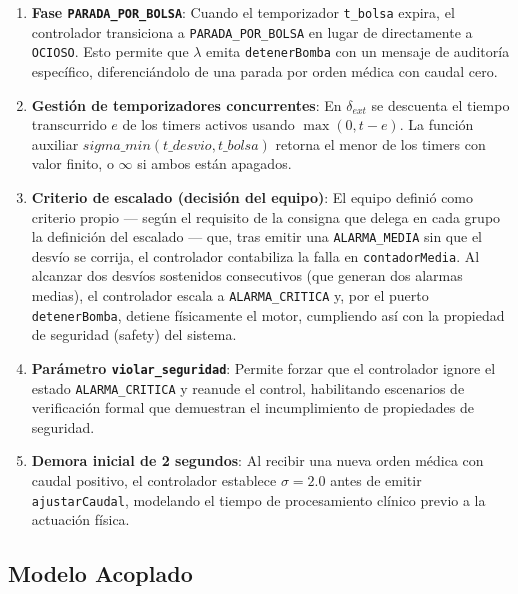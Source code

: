 \documentclass[12pt,a4paper]{article}
\begin{document}
\begin{enumerate}
    \item \textbf{Fase \texttt{PARADA\_POR\_BOLSA}}: Cuando el
    temporizador \texttt{t\_bolsa} expira, el controlador transiciona
    a \texttt{PARADA\_POR\_BOLSA} en lugar de directamente a
    \texttt{OCIOSO}.  Esto permite que $\lambda$ emita
    \texttt{detenerBomba} con un mensaje de auditoría específico,
    diferenciándolo de una parada por orden médica con caudal cero.

    \item \textbf{Gestión de temporizadores concurrentes}: En
    $\delta_{\mathit{ext}}$ se descuenta el tiempo transcurrido $e$ de
    los timers activos usando $\max(0, t - e)$.  La función auxiliar
    $\mathit{sigma\_min}(t\_desvio, t\_bolsa)$ retorna el menor de los
    timers con valor finito, o $\infty$ si ambos están apagados.

    \item \textbf{Criterio de escalado (decisión del equipo)}: El
    equipo definió como criterio propio --- según el requisito de la
    consigna que delega en cada grupo la definición del escalado ---
    que, tras emitir una \texttt{ALARMA\_MEDIA} sin que el desvío se
    corrija, el controlador contabiliza la falla en
    \texttt{contadorMedia}.  Al alcanzar dos desvíos sostenidos
    consecutivos (que generan dos alarmas medias), el controlador
    escala a \texttt{ALARMA\_CRITICA} y, por el puerto
    \texttt{detenerBomba}, detiene físicamente el motor, cumpliendo
    así con la propiedad de seguridad (safety) del sistema.

    \item \textbf{Parámetro \texttt{violar\_seguridad}}: Permite forzar
    que el controlador ignore el estado \texttt{ALARMA\_CRITICA} y
    reanude el control, habilitando escenarios de verificación formal
    que demuestran el incumplimiento de propiedades de seguridad.

    \item \textbf{Demora inicial de 2 segundos}: Al recibir una nueva
    orden médica con caudal positivo, el controlador establece
    $\sigma = 2.0$ antes de emitir \texttt{ajustarCaudal}, modelando
    el tiempo de procesamiento clínico previo a la actuación física.
\end{enumerate}

\subsection{Modelo Acoplado}
\end{document}
